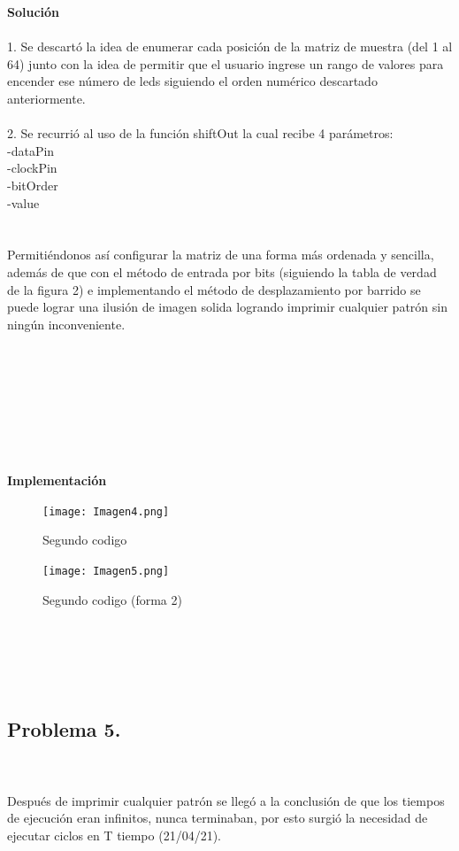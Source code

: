 \documentclass{article}
\begin{document}
\textbf{\large Solución}\\\\
1. Se descartó la idea de enumerar cada posición de la matriz de muestra (del 1 al 64) junto con la idea de permitir que el usuario ingrese un rango de valores para encender ese número de leds siguiendo el orden numérico descartado anteriormente.\\\\
2. Se recurrió al uso de la función shiftOut \cite{arduino} la cual recibe 4 parámetros:\\

-dataPin\\

-clockPin\\

-bitOrder\\

-value\\
\\\\

Permitiéndonos así configurar la matriz de una forma más ordenada y sencilla, además de que con el método de entrada por bits (siguiendo la tabla de verdad  de la figura 2) e implementando el método de desplazamiento por barrido \cite{veritasium} se puede lograr una ilusión de imagen solida logrando imprimir cualquier patrón sin ningún inconveniente.\\\\
\\\\
\\\\
\\\\
\\

\textbf{\large Implementación}\\
\begin{figure}[h]
    \texttt{[image: Imagen4.png]}
    \centering
    \caption{Segundo codigo}
    \label{fig:Imagen4}
\end{figure}
\begin{figure}[h]
    \texttt{[image: Imagen5.png]}
    \centering
    \caption{Segundo codigo (forma 2)}
    \label{fig:Imagen4}
\end{figure}\\\\
\\\\
\subsection{\large Problema 5.}\\\\
Después de imprimir cualquier patrón se llegó a la conclusión de que los tiempos de ejecución eran infinitos, nunca terminaban, por esto surgió la necesidad de ejecutar ciclos en T tiempo (21/04/21). \\
\end{document}
